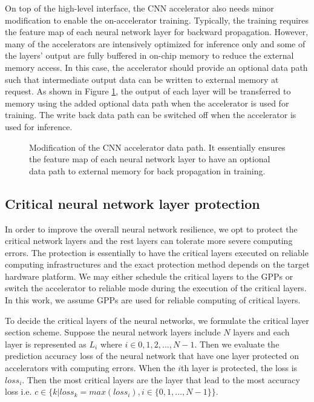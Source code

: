 On top of the high-level interface, the CNN accelerator also needs 
minor modification to enable the on-accelerator training. 
Typically, the training requires the feature map of each neural 
network layer for backward propagation. However, many of the accelerators 
are intensively optimized for inference only and some of the layers’ output 
are fully buffered in on-chip memory to reduce the external memory access. 
In this case, the accelerator should provide an optional data path such that 
intermediate output data can be written to external memory at request.
As shown in Figure \ref{fig:change_of_accelerator}, the output of each layer 
will be transferred to memory using the added optional data path 
when the accelerator is used for training. The write back data path 
can be switched off when the accelerator is used for inference. 

\begin{figure}
        \caption{Modification of the CNN accelerator data path. It essentially
ensures the feature map of each neural network layer to have an optional data path 
to external memory for back propagation in training.}
        \label{fig:change_of_accelerator}
        \vspace{-1em}
\end{figure}

\subsection{Critical neural network layer protection}
In order to improve the overall neural network resilience, we opt to 
protect the critical network layers and the rest layers can tolerate 
more severe computing errors. The protection is essentially 
to have the critical layers executed on reliable computing infrastructures 
and the exact protection method depends on the target hardware platform.
We may either schedule the critical layers to the GPPs or switch the accelerator 
to reliable mode during the execution of the critical layers.
In this work, we assume GPPs are used for reliable computing 
of critical layers. 

To decide the critical layers of the neural networks, we formulate the 
critical layer section scheme. Suppose the neural network layers include 
$N$ layers and each layer is represented as $L_i$ where $i \in {0, 1, 2, ..., N-1}$.
Then we evaluate the prediction accuracy loss of the neural network 
that have one layer protected on accelerators with computing errors.
When the $i$th layer is protected, the loss is $loss_i$.
Then the most critical layers are the layer that lead to the most 
accuracy loss i.e. $c \in \{k|loss_k = max(loss_i), i \in \{0, 1, ..., N-1\}\}$.

